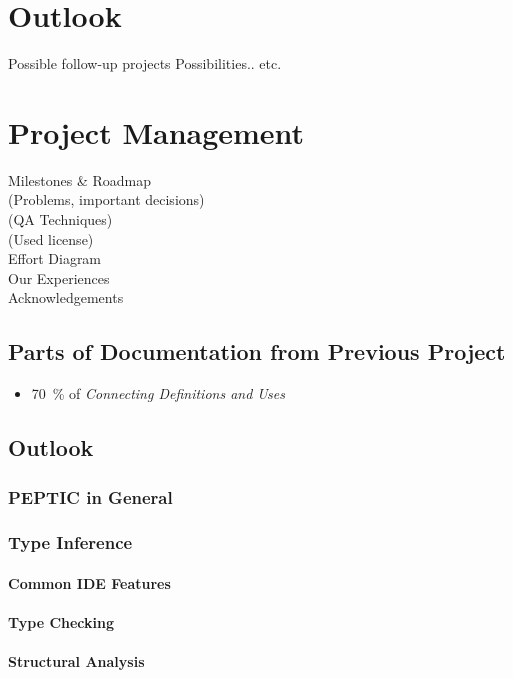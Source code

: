 \documentclass[12pt,halfparskip,DIV11,BCOR10mm]{scrreprt}
\begin{document}
\chapter{Outlook}
 Possible follow-up projects
 Possibilities.. etc.

\chapter{Project Management}
 Milestones \& Roadmap \\
 (Problems, important decisions) \\
 (QA Techniques) \\
 (Used license) \\
 Effort Diagram \\
 Our Experiences \\
 Acknowledgements 



\section{Parts of Documentation from Previous Project}

\begin{itemize}
	\item 70~\% of \emph{Connecting Definitions and Uses} %
\end{itemize}

\section{Outlook}
\subsection{PEPTIC in General}
\subsection{Type Inference}
\subsubsection{Common IDE Features}
\subsubsection{Type Checking}
\subsubsection{Structural Analysis}
\end{document}
